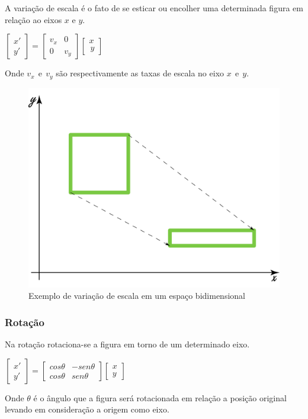 \documentclass[9pt, a4paper, nofonttune, journal]{IEEEtran}
\begin{document}
A variação de escala é o fato de se esticar ou encolher uma determinada figura em relação ao eixos $x$ e $y$.

\begin{center}
$\begin{bmatrix}x'\\
y'
\end{bmatrix}=\begin{bmatrix}v_{x} & 0\\
0 & v_{y}
\end{bmatrix}\begin{bmatrix}x\\
\frac{}{}y
\end{bmatrix}$\end{center}
Onde $v_{x}~~ \textrm{e} ~~ v_{y}$ são respectivamente as taxas de escala no eixo $x~~ \textrm{e} ~~y$.\cite{CGPPBook1}


\begin{figure}[H]
\begin{center}
\includegraphics[scale=0.25]{figuras/scale1}
\caption{Exemplo de variação de escala em um espaço bidimensional}
\end{center}
\end{figure}

\subsubsection{Rotação}
Na rotação rotaciona-se a figura em torno de um determinado eixo.

\begin{center}
$\begin{bmatrix}x'\\
y'
\end{bmatrix}=\begin{bmatrix}cos\theta & -sen\theta\\
cos\theta & sen\theta
\end{bmatrix}\begin{bmatrix}x\\
y
\end{bmatrix}$\end{center}
Onde $\theta$ é o ângulo que a figura será rotacionada em relação a posição original levando em consideração a origem como eixo. \cite{CGPPBook1}
\end{document}
